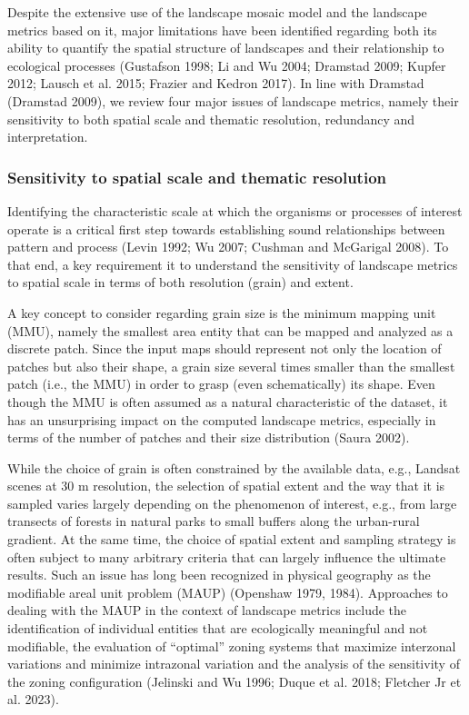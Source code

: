 \documentclass[
  10pt,
  a4paperpaper,
]{article}
\begin{document}
Despite the extensive use of the landscape mosaic model and the
landscape metrics based on it, major limitations have been identified
regarding both its ability to quantify the spatial structure of
landscapes and their relationship to ecological processes (Gustafson
1998; Li and Wu 2004; Dramstad 2009; Kupfer 2012; Lausch et al. 2015;
Frazier and Kedron 2017). In line with Dramstad (Dramstad 2009), we
review four major issues of landscape metrics, namely their sensitivity
to both spatial scale and thematic resolution, redundancy and
interpretation.

\subsubsection{Sensitivity to spatial scale and thematic
resolution}\label{sensitivity-to-spatial-scale-and-thematic-resolution}

Identifying the characteristic scale at which the organisms or processes
of interest operate is a critical first step towards establishing sound
relationships between pattern and process (Levin 1992; Wu 2007; Cushman
and McGarigal 2008). To that end, a key requirement it to understand the
sensitivity of landscape metrics to spatial scale in terms of both
resolution (grain) and extent.

A key concept to consider regarding grain size is the minimum mapping
unit (MMU), namely the smallest area entity that can be mapped and
analyzed as a discrete patch. Since the input maps should represent not
only the location of patches but also their shape, a grain size several
times smaller than the smallest patch (i.e., the MMU) in order to grasp
(even schematically) its shape. Even though the MMU is often assumed as
a natural characteristic of the dataset, it has an unsurprising impact
on the computed landscape metrics, especially in terms of the number of
patches and their size distribution (Saura 2002).

While the choice of grain is often constrained by the available data,
e.g., Landsat scenes at 30 m resolution, the selection of spatial extent
and the way that it is sampled varies largely depending on the
phenomenon of interest, e.g., from large transects of forests in natural
parks to small buffers along the urban-rural gradient. At the same time,
the choice of spatial extent and sampling strategy is often subject to
many arbitrary criteria that can largely influence the ultimate results.
Such an issue has long been recognized in physical geography as the
modifiable areal unit problem (MAUP) (Openshaw 1979, 1984). Approaches
to dealing with the MAUP in the context of landscape metrics include the
identification of individual entities that are ecologically meaningful
and not modifiable, the evaluation of ``optimal'' zoning systems that
maximize interzonal variations and minimize intrazonal variation and the
analysis of the sensitivity of the zoning configuration (Jelinski and Wu
1996; Duque et al. 2018; Fletcher Jr et al. 2023).
\end{document}
